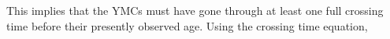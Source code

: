 This implies that the YMCs must have gone through at least one full crossing time before their presently observed age. Using the crossing time equation, 
